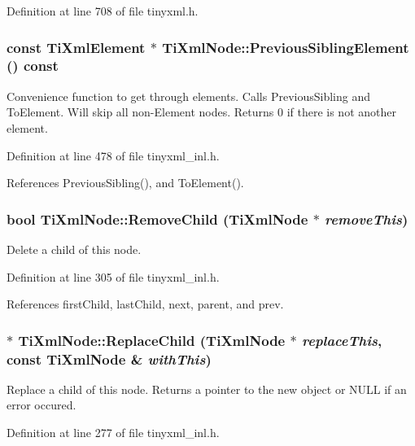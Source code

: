 Definition at line 708 of file tinyxml.h.\hypertarget{class_ti_xml_node_a37d2f0359c5e2d82141646d969bc8666}{
\subsubsection[{PreviousSiblingElement}]{\setlength{\rightskip}{0pt plus 5cm}const {\bf TiXmlElement} $\ast$ TiXmlNode::PreviousSiblingElement () const}}
\label{class_ti_xml_node_a37d2f0359c5e2d82141646d969bc8666}
Convenience function to get through elements. Calls PreviousSibling and ToElement. Will skip all non-\/Element nodes. Returns 0 if there is not another element. 

Definition at line 478 of file tinyxml\_\-inl.h.

References PreviousSibling(), and ToElement().\hypertarget{class_ti_xml_node_ae19d8510efc90596552f4feeac9a8fbf}{
\subsubsection[{RemoveChild}]{\setlength{\rightskip}{0pt plus 5cm}bool TiXmlNode::RemoveChild ({\bf TiXmlNode} $\ast$ {\em removeThis})}}
\label{class_ti_xml_node_ae19d8510efc90596552f4feeac9a8fbf}


Delete a child of this node. 

Definition at line 305 of file tinyxml\_\-inl.h.

References firstChild, lastChild, next, parent, and prev.\hypertarget{class_ti_xml_node_a543208c2c801c84a213529541e904b9f}{
\subsubsection[{ReplaceChild}]{ $\ast$ TiXmlNode::ReplaceChild ({\bf TiXmlNode} $\ast$ {\em replaceThis}, \/  const {\bf TiXmlNode} \& {\em withThis})}}
\label{class_ti_xml_node_a543208c2c801c84a213529541e904b9f}
Replace a child of this node. Returns a pointer to the new object or NULL if an error occured. 

Definition at line 277 of file tinyxml\_\-inl.h.

